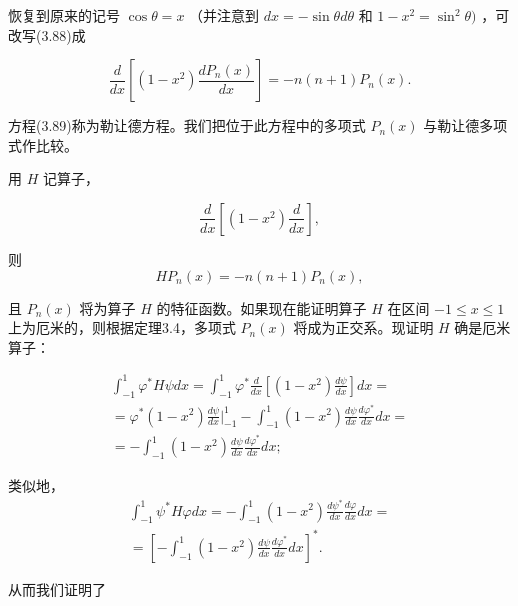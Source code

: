恢复到原来的记号 $\cos \theta = x$ （并注意到 $dx = -\sin \theta d\theta$ 和 $1 - x^{2} = \sin^{2}\theta)$ ，可改写(3.88)成

\begin{equation*}
\frac {d}{d x} \left[ (1 - x ^ {2}) \frac {d P _ {n} (x)}{d x} \right] = - n (n + 1) P _ {n} (x).\tag{3.89}
\end{equation*}

方程(3.89)称为勒让德方程。我们把位于此方程中的多项式 $P_{n}(x)$ 与勒让德多项式作比较。

用 $H$ 记算子，

\begin{equation*}
\frac {d}{d x} \left[ (1 - x ^ {2}) \frac {d}{d x} \right],
\end{equation*}

则
\begin{equation*}
H P _ {n} (x) = - n (n + 1) P _ {n} (x),\tag{3.90}
\end{equation*}

且 $P_{n}(x)$ 将为算子 $H$ 的特征函数。如果现在能证明算子 $H$ 在区间 $-1 \leqslant x \leqslant 1$ 上为厄米的，则根据定理3.4，多项式 $P_{n}(x)$ 将成为正交系。现证明 $H$ 确是厄米算子：

\begin{equation*}
\begin{array}{l} \int_ {- 1} ^ {1} \varphi^ {*} H \psi d x = \int_ {- 1} ^ {1} \varphi^ {*} \frac {d}{d x} \left[ (1 - x ^ {2}) \frac {d \psi}{d x} \right] d x = \\ = \varphi^ {*} (1 - x ^ {2}) \frac {d \psi}{d x} \Bigg | _ {- 1} ^ {1} - \int_ {- 1} ^ {1} (1 - x ^ {2}) \frac {d \psi}{d x} \frac {d \varphi^ {*}}{d x} d x = \\ = - \int_ {- 1} ^ {1} (1 - x ^ {2}) \frac {d \psi}{d x} \frac {d \varphi^ {*}}{d x} d x; \end{array}
\end{equation*}

类似地，
\begin{equation*}
\begin{array}{l} \int_ {- 1} ^ {1} \psi^ {*} H \varphi d x = - \int_ {- 1} ^ {1} (1 - x ^ {2}) \frac {d \psi^ {*}}{d x} \frac {d \varphi}{d x} d x = \\ = \left[ - \int_ {- 1} ^ {1} (1 - x ^ {2}) \frac {d \psi}{d x} \frac {d \varphi^ {*}}{d x} d x \right] ^ {*}. \end{array}
\end{equation*}

从而我们证明了

